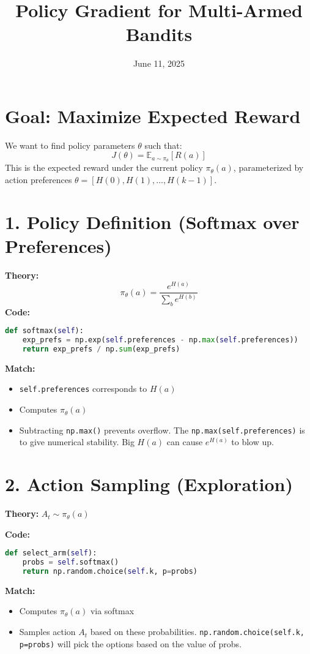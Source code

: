 \documentclass{article}
\title{Policy Gradient for Multi-Armed Bandits}
\date{June 11, 2025}
\begin{document}
\maketitle

\section*{Goal: Maximize Expected Reward}
We want to find policy parameters $\theta$ such that:
\[
J(\theta) = \mathbb{E}_{a \sim \pi_\theta}[R(a)]
\]
This is the expected reward under the current policy $\pi_\theta(a)$, parameterized by action preferences $\theta = [H(0), H(1), \ldots, H(k-1)]$.

\section*{1. Policy Definition (Softmax over Preferences)}
\textbf{Theory:}
\[
\pi_\theta(a) = \frac{e^{H(a)}}{\sum_b e^{H(b)}}
\]
\textbf{Code:}
\begin{lstlisting}[language=Python]
def softmax(self):
    exp_prefs = np.exp(self.preferences - np.max(self.preferences))
    return exp_prefs / np.sum(exp_prefs)
\end{lstlisting}

\textbf{Match:}
\begin{itemize}
  \item \texttt{self.preferences} corresponds to $H(a)$
  \item Computes $\pi_\theta(a)$
  \item Subtracting \texttt{np.max()} prevents overflow. The \texttt{np.max(self.preferences)} is to give numerical stability. Big $H(a)$ can cause $e^{H(a)}$ to blow up.
\end{itemize}

\section*{2. Action Sampling (Exploration)}
\textbf{Theory:} $A_t \sim \pi_\theta(a)$

\textbf{Code:}
\begin{lstlisting}[language=Python]
def select_arm(self):
    probs = self.softmax()
    return np.random.choice(self.k, p=probs)
\end{lstlisting}
\textbf{Match:}
\begin{itemize}
  \item Computes $\pi_\theta(a)$ via softmax
  \item Samples action $A_t$ based on these probabilities. \texttt{np.random.choice(self.k, p=probs)} will pick the options based on the value of probs.
\end{itemize}
\end{document}
